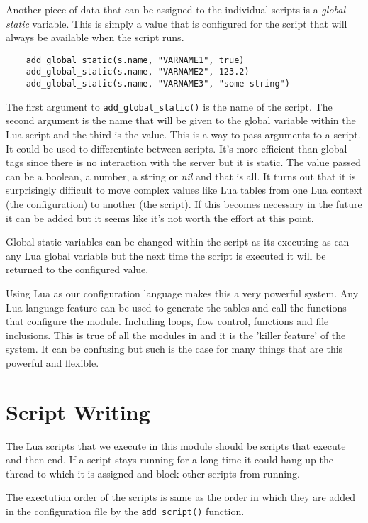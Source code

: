 Another piece of data that can be assigned to the individual scripts is a \textit{global static}
variable.  This is simply a value that is configured for the script that will always be
available when the script runs.

\begin{verbatim}
	add_global_static(s.name, "VARNAME1", true)
	add_global_static(s.name, "VARNAME2", 123.2)
	add_global_static(s.name, "VARNAME3", "some string")
\end{verbatim}

The first argument to \texttt{add\_global\_static()} is the name of the script.  The second
argument is the name that will be given to the global variable within the Lua script and
the third is the value.  This is a way to pass arguments to a script.  It could be used
to differentiate between scripts.  It's more efficient than global tags since there is no
interaction with the server but it is static.  The value passed can be a boolean, a number,
a string or \textit{nil} and that is all.  It turns out that it is surprisingly difficult
to move complex values like Lua tables from one Lua context (the configuration) to another
(the script).  If this becomes necessary in the future it can be added but it seems like it's
not worth the effort at this point.

Global static variables can be changed within the script as its executing as can any Lua
global variable but the next time the script is executed it will be returned to the
configured value.

Using Lua as our configuration language makes this a very powerful system.  Any Lua language
feature can be used to generate the tables and call the functions that configure the module.
Including loops, flow control, functions and file inclusions.
This is true of all the modules in \opendax and it is the 'killer feature' of
the system.  It can be confusing but such is the case for many things that are this powerful
and flexible.

\section{Script Writing}

The Lua scripts that we execute in this module should be scripts that execute and then
end.  If a script stays running for a long time it could hang up the thread to which it
is assigned and block other scripts from running.

The exectution order of the scripts is same as the order in which they are added in the
configuration file by the \texttt{add\_script()} function.

